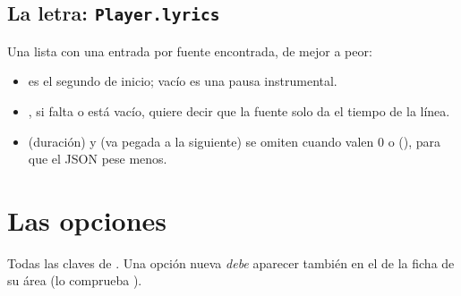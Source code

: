 \subsection{La letra: \texttt{Player.lyrics}}

Una lista con una entrada por fuente encontrada, de mejor a peor:

\begin{codigo}
\end{codigo}

\begin{itemize}
  \item {} es el segundo de inicio;  vacío es una pausa instrumental.
  \item {}, si falta o está vacío, quiere decir que la fuente solo da el tiempo de la
  línea.
  \item {} (duración) y  (va pegada a la siguiente) se omiten cuando valen 0 o
   (), para que el JSON pese menos.
\end{itemize}

\section{Las opciones}

Todas las claves de . Una opción nueva \emph{debe} aparecer también en
el  de la ficha de su área (lo comprueba ).

